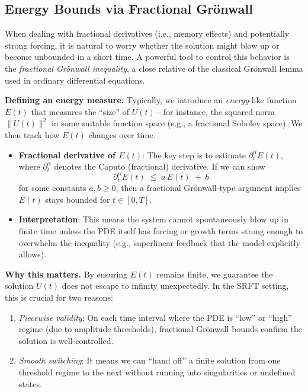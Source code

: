 \documentclass[12pt]{article}
\begin{document}
\subsection{Energy Bounds via Fractional Grönwall}
\label{subsec:energy_bounds_gronwall}

When dealing with fractional derivatives (i.e., memory effects) and potentially
strong forcing, it is natural to worry whether the solution might blow up or
become unbounded in a short time. A powerful tool to control this behavior is
the \emph{fractional Grönwall inequality}, a close relative of the classical
Grönwall lemma used in ordinary differential equations.

\medskip

\noindent
\textbf{Defining an energy measure.}
Typically, we introduce an \emph{energy}-like function $E(t)$ that measures
the “size” of $U(t)$—for instance, the squared norm $\|U(t)\|^2$ in some suitable
function space (e.g., a fractional Sobolev space). We then track how $E(t)$ changes
over time.

\begin{itemize}
    \item \textbf{Fractional derivative of $E(t)$}: The key step is to estimate
          $\partial_t^\alpha E(t)$, where $\partial_t^\alpha$ denotes the
          Caputo (fractional) derivative. If we can show
          \[
            \partial_t^\alpha E(t) \;\le\; a \, E(t) \;+\; b
          \]
          for some constants $a,b\geq 0$, then a fractional Grönwall-type argument
          implies $E(t)$ stays bounded for $t \in [0,T]$.
    \item \textbf{Interpretation}: This means the system cannot spontaneously
          blow up in finite time unless the PDE itself has forcing or
          growth terms strong enough to overwhelm the inequality (e.g.,
          superlinear feedback that the model explicitly allows).
\end{itemize}

\medskip

\noindent
\textbf{Why this matters.}
By ensuring $E(t)$ remains finite, we guarantee the solution $U(t)$ does not escape
to infinity unexpectedly. In the SRFT setting, this is crucial for two reasons:
\begin{enumerate}
    \item \emph{Piecewise validity}: On each time interval where the PDE is
          “low” or “high” regime (due to amplitude thresholds), fractional
          Grönwall bounds confirm the solution is well-controlled.
    \item \emph{Smooth switching}: It means we can “hand off” a finite solution
          from one threshold regime to the next without running into singularities
          or undefined states.
\end{enumerate}
\end{document}
